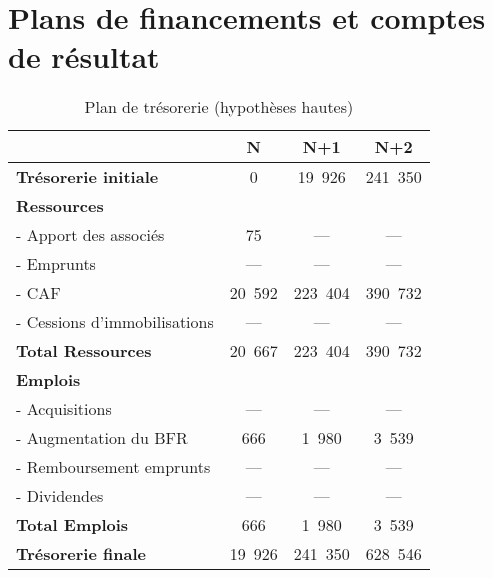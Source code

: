 \chapter[Financements et résultat]{Plans de financements et comptes de r\'esultat}
\label{tableaux}
		\begin{table}[h]
			\centering
			\begin{tabular}{|l|c|c|c|}
				\hline
				& {\bf N} & {\bf N+1} & {\bf N+2} \\
				\hline
			{\bf Tr\'esorerie initiale} & 0 & 19~926 & 241~350 \\
				\cline{2-4}
				{\bf Ressources} & & & \\
				- Apport des associ\'es & 75 & --- & --- \\
				- Emprunts & --- & --- & --- \\
				- CAF & 20~592 & 223~404 & 390~732 \\
				- Cessions d'immobilisations & --- & --- & --- \\
				\cline{2-4}
				{\bf Total Ressources} & 20~667 & 223~404 & 390~732 \\
				\cline{2-4}
				{\bf Emplois} & & & \\
				- Acquisitions & --- & --- & --- \\
				- Augmentation du BFR & 666 & 1~980 & 3~539 \\
				- Remboursement emprunts & --- & --- & --- \\
				- Dividendes & --- & --- & --- \\
				\cline{2-4}
				{\bf Total Emplois} & 666 & 1~980 & 3~539 \\
				\cline{2-4}
				{\bf Tr\'esorerie finale} & 19~926 & 241~350 & 628~546 \\
				\hline
			\end{tabular}
			\caption{Plan de tr\'esorerie (hypoth\`eses hautes)}
			\label{tab:planTresoH}
		\end{table}

